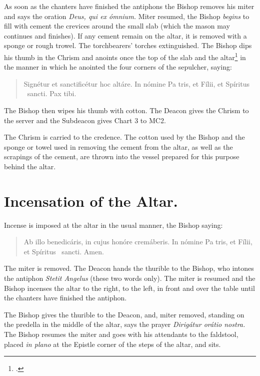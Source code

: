 \documentclass[letterpaper]{report}
\newcommand\blessincense{
\begin{quote}
   Ab illo benedicáris, in cujus honóre cremáberis. In nómine Pa\cross
    tris, et Fí\cross lii, et Spíritus \cross\ sancti. \rbar Amen.
\end{quote}
}
\begin{document}
{    \rubric As soon as the chanters have finished the antiphons the Bishop
    removes his miter and says the oration \textit{Deus, qui ex ómnium.} Miter
    resumed, the Bishop \textit{begins} to fill with cement the crevices around
    the small slab (which the mason may continues and finishes). If any cement
    remain on the altar, it is removed with a sponge or rough
    trowel. The torchbearers' torches extinguished. The Bishop dips his
    thumb in the Chrism and anoints once the top of the slab and the
    altar\footcite[Martinucci, Hartmann, Moretti, etc., say that the cross
    should be made not only on the slab, but also on the portions of the table
    of the altar near the slab.][footnote 1, p. 90.]{consecranda} in the manner
    in which he anointed the four corners of the sepulcher, saying:

    \begin{quote}
        Signé\cross tur et sancti\cross ficétur hoc altáre. In nómine Pa\cross
        tris, et Fí\cross lii, et Spíritus \cross\ sancti. Pax tibi.
    \end{quote}

    The Bishop then wipes his thumb with cotton. The Deacon gives the Chrism to the
    server and the Subdeacon gives Chart 3 to MC2.

    The Chrism is carried to the credence. The cotton used by the Bishop and
    the sponge or towel used in removing the cement from the altar, as well as
    the scrapings of the cement, are thrown into the vessel prepared for this
    purpose behind the altar.

    \section{Incensation of the Altar.}

    \rubric Incense is imposed at the altar in the usual manner, the Bishop
    saying:

    \blessincense

    The miter is removed. The Deacon hands the thurible to the Bishop, who
    intones the antiphon \textit{Stetit Angelus} (these two words only). The
    miter is resumed and the Bishop incenses the altar to the right, to the
    left, in front and over the table until the chanters have finished the
    antiphon.

    \rubric The Bishop gives the thurible to the Deacon, and, miter removed,
    standing on the predella in the middle of the altar, says the prayer
    \textit{Dirigátur orátio nostra.} The Bishop resumes the miter and goes
    with his attendants to the faldstool, placed \textit{in plano} at the
    Epistle corner of the steps of the altar, and sits.

}
\end{document}
